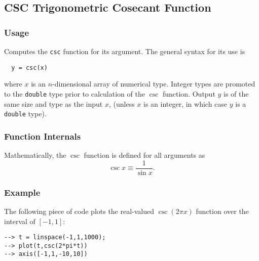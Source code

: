 %
%
%
\subsection{CSC Trigonometric Cosecant Function}
\subsubsection{Usage}
Computes the \verb|csc| function for its argument.  The general
syntax for its use is
\begin{verbatim}
  y = csc(x)
\end{verbatim}
where $x$ is an $n$-dimensional array of numerical type.
Integer types are promoted to the \verb|double| type prior to
calculation of the $\csc$ function.  Output $y$ is of the
same size and type as the input $x$, (unless $x$ is an
integer, in which case $y$ is a \verb|double| type).  
\subsubsection{Function Internals}
Mathematically, the $\csc$ function is defined for all arguments
as
\[
   \csc x \equiv \frac{1}{\sin x}.
\]
\subsubsection{Example}
The following piece of code plots the real-valued $\csc(2\pi x)$
function over the interval of $[-1,1]$:
\begin{verbatim}
--> t = linspace(-1,1,1000);
--> plot(t,csc(2*pi*t))
--> axis([-1,1,-10,10])
\end{verbatim}
